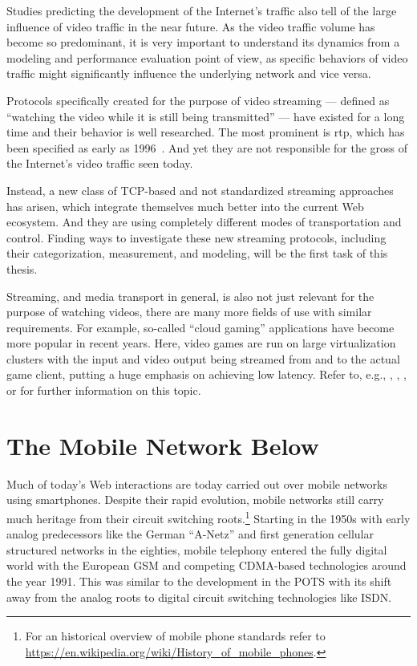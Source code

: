 Studies predicting the development of the Internet's traffic also tell of the large influence of video traffic in the near future. As the video traffic volume has become so predominant, it is very important to understand its dynamics from a modeling and performance evaluation point of view, as specific behaviors of video traffic might significantly influence the underlying network and vice versa. 

Protocols specifically created for the purpose of video streaming --- defined as ``watching the video while it is still being transmitted'' --- have existed for a long time and their behavior is well researched. The most prominent is \gls{rtp}, which has been specified as early as 1996~\cite{rfc1889}. And yet they are not responsible for the gross of the Internet's video traffic seen today.

Instead, a new class of \gls{TCP}-based and not standardized streaming approaches has arisen, which integrate themselves much better into the current Web ecosystem. And they are using completely different modes of transportation and control. Finding ways to investigate these new streaming protocols, including their categorization, measurement, and modeling, will be the first task of this thesis.

Streaming, and media transport in general, is also not just relevant for the purpose of watching videos, there are many more fields of use with similar requirements. For example, so-called ``cloud gaming'' applications have become more popular in recent years. Here, video games are run on large virtualization clusters with the input and video output being streamed from and to the actual game client, putting a huge emphasis on achieving low latency. Refer to, e.g., \cite{4795441}, \cite{wang2009modeling}, \cite{jarschel2011cloudevaluation}, or \cite{ct2010wolken} for further information on this topic.


\section{The Mobile Network Below}

Much of today's Web interactions are today carried out over mobile networks using smartphones. Despite their rapid evolution, mobile networks still carry much heritage from their circuit switching roots.\footnote{For an historical overview of mobile phone standards refer to \url{https://en.wikipedia.org/wiki/History_of_mobile_phones}.}
Starting in the 1950s with early analog predecessors like the German ``A-Netz'' and first generation cellular structured networks in the eighties, mobile telephony entered the fully digital world with the European \gls{GSM} and competing \gls{CDMA}-based technologies around the year 1991. This was similar to the development in the \gls{POTS} with its shift away from the analog roots to digital circuit switching technologies like \gls{ISDN}.

